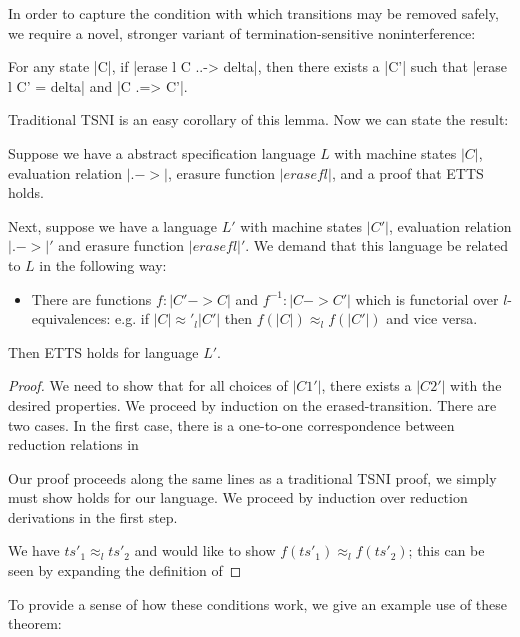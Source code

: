 In order to capture the condition with which transitions may be removed
safely, we require a novel, stronger variant of termination-sensitive
noninterference:

\begin{lemma}
    For any state |C|, if |erase l C ..-> delta|, then there exists a |C'| such that
    |erase l C' = delta| and |C .=> C'|.
\end{lemma}

Traditional TSNI is an easy corollary of this lemma.   Now we can state the result:

\begin{theorem}
    Suppose we have a abstract specification language $L$ with machine
    states $|C|$, evaluation relation $|.->|$, erasure function $|erasef l|$,
    and a proof that ETTS holds.

    Next, suppose we have a language $L'$ with machine states $|C'|$,
    evaluation relation $|.->|'$ and erasure function $|erasef l|'$.  We demand that this
    language be related to $L$ in the following way:

    \begin{itemize}
        \item There are functions $f : |C' -> C|$ and $f^{-1} : |C -> C'|$ which is functorial
            over $l$-equivalences: e.g. if $|C| \approx'_l |C'|$ then
            $f(|C|) \approx_l f(|C'|)$ and vice versa.
    \end{itemize}

    Then ETTS holds for language $L'$.
\end{theorem}

\begin{proof}
We need to show that for all choices of $|C1'|$, there exists a $|C2'|$ with
the desired properties.  We proceed by induction on the erased-transition.
There are two cases.  In the first case, there is a one-to-one correspondence
between reduction relations in 

Our proof proceeds along the same lines as a traditional TSNI proof,
we simply must show  holds for our language.  We proceed by induction
over reduction derivations in the first step.

We have $ts'_1 \approx_l ts'_2$ and would like to show $f(ts'_1) \approx_l f(ts'_2)$;
this can be seen by expanding the definition of
\end{proof}

To provide a sense of how these conditions work, we give an example
use of these theorem:

